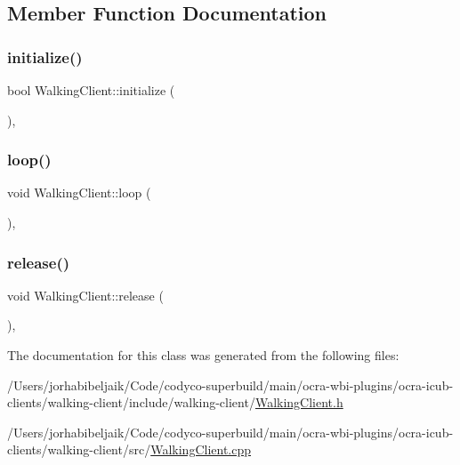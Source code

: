 \subsection{Member Function Documentation}
\hypertarget{classWalkingClient_aba6a03fe29a4e947bc6bc0c09a713b2a}{}\label{classWalkingClient_aba6a03fe29a4e947bc6bc0c09a713b2a} 
\subsubsection{\texorpdfstring{initialize()}{initialize()}}
{\footnotesize\ttfamily bool Walking\+Client\+::initialize (\begin{DoxyParamCaption}{ }\end{DoxyParamCaption})\hspace{0.3cm}{\ttfamily [protected]}, {\ttfamily [virtual]}}

\hypertarget{classWalkingClient_afd997bb00534c57fe1b0d5f37f207386}{}\label{classWalkingClient_afd997bb00534c57fe1b0d5f37f207386} 
\subsubsection{\texorpdfstring{loop()}{loop()}}
{\footnotesize\ttfamily void Walking\+Client\+::loop (\begin{DoxyParamCaption}{ }\end{DoxyParamCaption})\hspace{0.3cm}{\ttfamily [protected]}, {\ttfamily [virtual]}}

\hypertarget{classWalkingClient_a3b36da9d7649865a13c9318dd73ebc7e}{}\label{classWalkingClient_a3b36da9d7649865a13c9318dd73ebc7e} 
\subsubsection{\texorpdfstring{release()}{release()}}
{\footnotesize\ttfamily void Walking\+Client\+::release (\begin{DoxyParamCaption}{ }\end{DoxyParamCaption})\hspace{0.3cm}{\ttfamily [protected]}, {\ttfamily [virtual]}}



The documentation for this class was generated from the following files\+:\begin{DoxyCompactItemize}
\item 
/\+Users/jorhabibeljaik/\+Code/codyco-\/superbuild/main/ocra-\/wbi-\/plugins/ocra-\/icub-\/clients/walking-\/client/include/walking-\/client/\hyperlink{WalkingClient_8h}{Walking\+Client.\+h}\item 
/\+Users/jorhabibeljaik/\+Code/codyco-\/superbuild/main/ocra-\/wbi-\/plugins/ocra-\/icub-\/clients/walking-\/client/src/\hyperlink{WalkingClient_8cpp}{Walking\+Client.\+cpp}\end{DoxyCompactItemize}

